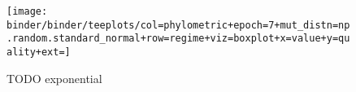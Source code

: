 \begin{sidewaysfigure*}
  \centering
  \texttt{[image: binder/binder/teeplots/col=phylometric+epoch=7+mut\_distn=np.random.standard\_normal+row=regime+viz=boxplot+x=value+y=quality+ext=]}
  \caption{TODO exponential}
  \label{fig:reconstructed-tree-phylometrics-exponential}
\end{sidewaysfigure*}
